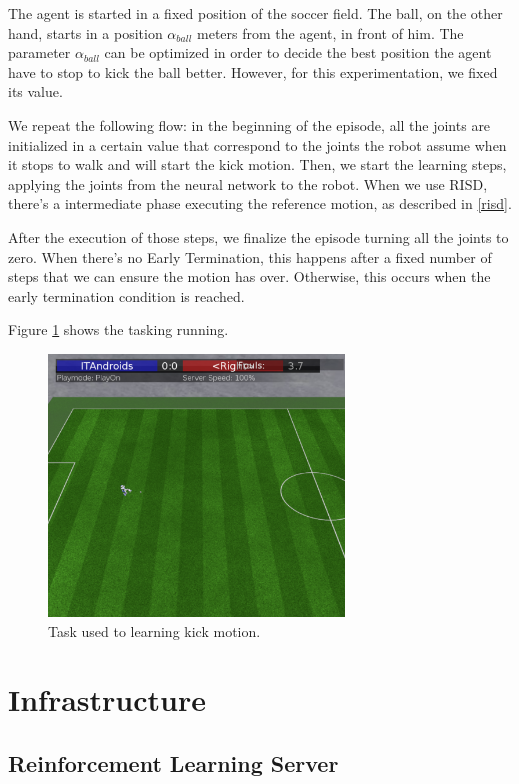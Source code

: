 The agent is started in a fixed position of the soccer field. The ball, on the other hand, starts in a position $\alpha_{ball}$ meters from the agent, in front of him. The parameter $\alpha_{ball}$ can be optimized in order to decide the best position the agent have to stop to kick the ball better. However, for this experimentation, we fixed its value.

We repeat the following flow: in the beginning of the episode, all the joints are initialized in a certain value that correspond to the joints the robot assume when it stops to walk and will start the kick motion. Then, we start the learning steps, applying the joints from the neural network to the robot. When we use RISD, there's a intermediate phase executing the reference motion, as described in \ref{risd}.

After the execution of those steps, we finalize the episode turning all the joints to zero. When there's no Early Termination, this happens after a fixed number of steps that we can ensure the motion has over. Otherwise, this occurs when the early termination condition is reached.

Figure \ref{taskdescription} shows the tasking running.


\begin{figure}[!htbp]
	\centering
	\includegraphics[width=0.7\textwidth]{Cap5/taskdescription.eps}
	\caption{Task used to learning kick motion.}
	\label{taskdescription}
\end{figure}

\section{Infrastructure}
\subsection{Reinforcement Learning Server}\label{rlarchitecture}

